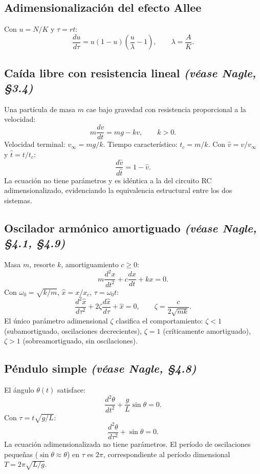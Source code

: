 \documentclass[11pt,letterpaper]{article}
\newcommand{\naglecite}[1]{\emph{(véase Nagle, #1)}}
\begin{document}
\subsection{Adimensionalización del efecto Allee}

Con $u=N/K$ y $\tau=rt$:
\[
\frac{du}{d\tau}=u(1-u)\!\left(\frac{u}{\lambda}-1\right),
\qquad \lambda=\frac{A}{K}.
\]

\subsection{Caída libre con resistencia lineal \naglecite{§3.4}}

Una partícula de masa $m$ cae bajo gravedad con resistencia proporcional a la velocidad:
\[
m\frac{dv}{dt}=mg-kv,\qquad k>0.
\]
Velocidad terminal: $v_\infty=mg/k$. Tiempo característico: $t_c=m/k$.
Con $\hat{v}=v/v_\infty$ y $\hat{t}=t/t_c$:
\[
\boxed{\frac{d\hat{v}}{d\hat{t}}=1-\hat{v}.}
\]
La ecuación no tiene parámetros y es idéntica a la del circuito RC adimensionalizado,
evidenciando la equivalencia estructural entre los dos sistemas.

\subsection{Oscilador armónico amortiguado \naglecite{§4.1, §4.9}}

Masa $m$, resorte $k$, amortiguamiento $c\geq 0$:
\[
m\frac{d^2x}{dt^2}+c\frac{dx}{dt}+kx=0.
\]
Con $\omega_0=\sqrt{k/m}$, $\hat{x}=x/x_c$, $\tau=\omega_0 t$:
\[
\boxed{\frac{d^2\hat{x}}{d\tau^2}+2\zeta\frac{d\hat{x}}{d\tau}+\hat{x}=0,}
\qquad \zeta=\frac{c}{2\sqrt{mk}}.
\]
El único parámetro adimensional $\zeta$ clasifica el comportamiento:
$\zeta<1$ (subamortiguado, oscilaciones decrecientes), $\zeta=1$ (críticamente amortiguado),
$\zeta>1$ (sobreamortiguado, sin oscilaciones).

\subsection{Péndulo simple \naglecite{§4.8}}

El ángulo $\theta(t)$ satisface:
\[
\frac{d^2\theta}{dt^2}+\frac{g}{L}\sin\theta=0.
\]
Con $\tau=t\sqrt{g/L}$:
\[
\boxed{\frac{d^2\theta}{d\tau^2}+\sin\theta=0.}
\]
La ecuación adimensionalizada no tiene parámetros. El período de oscilaciones
pequeñas ($\sin\theta\approx\theta$) en $\tau$ es $2\pi$, correspondiente al
período dimensional $T=2\pi\sqrt{L/g}$.
\end{document}

